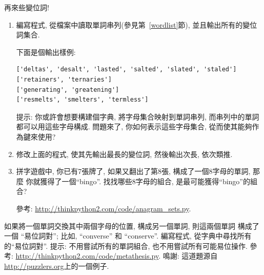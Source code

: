 \documentclass[10pt]{book}
\begin{document}
\begin{exercise}
\label{anagrams}

再來些變位詞!

\begin{enumerate}

\item 編寫程式, 從檔案中讀取單詞串列(參見第~\ref{wordlist}節), 
並且輸出所有的變位詞集合. 

下面是個輸出樣例:

\begin{verbatim}
['deltas', 'desalt', 'lasted', 'salted', 'slated', 'staled']
['retainers', 'ternaries']
['generating', 'greatening']
['resmelts', 'smelters', 'termless']
\end{verbatim}
%
提示: 你或許會想要構建個字典, 將字母集合映射到單詞串列, 
而串列中的單詞都可以用這些字母構成. 問題來了, 你如何表示這些字母集合, 
從而使其能夠作為鍵來使用?

\item 修改上面的程式, 使其先輸出最長的變位詞, 然後輸出次長, 依次類推. 

\item 拼字遊戲中, 你已有7張牌了, 如果又翻出了第8張, 構成了一個8字母的單詞, 那麼
你就獲得了一個``bingo''. 找找哪些8字母的組合, 是最可能獲得``bingo''的組合?


參考: \url{http://thinkpython2.com/code/anagram_sets.py}.

\end{enumerate}
\end{exercise}

\begin{exercise}
如果將一個單詞交換其中兩個字母的位置, 構成另一個單詞, 則這兩個單詞
構成了一個 ``易位詞對''; 比如, ``converse'' 和 ``conserve''.  
編寫程式, 從字典中尋找所有的``易位詞對''.
提示: 不用嘗試所有的單詞組合, 也不用嘗試所有可能易位操作. 
參考:
\url{http://thinkpython2.com/code/metathesis.py}.  
鳴謝: 這道題源自\url{http://puzzlers.org}上的一個例子. 
\end{exercise}
\end{document}
